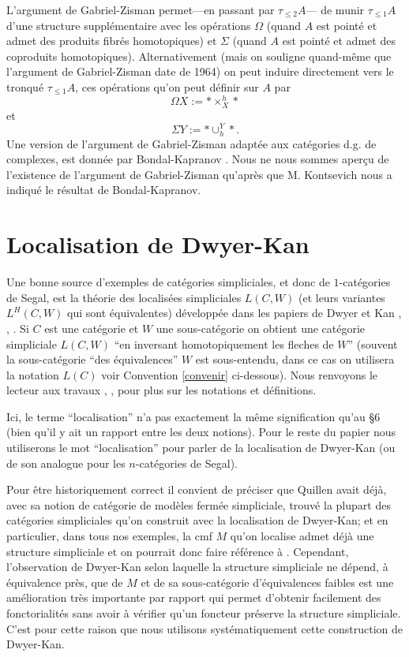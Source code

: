 \documentclass[12pt]{article}
\newcommand{\numero}[1]{\newpage\section{#1}}
\begin{document}
L'argument de Gabriel-Zisman permet---en passant par $\tau _{\leq 2}A$---
de munir $\tau _{\leq 1}A$
d'une structure suppl\'ementaire avec les
op\'erations $\Omega$ (quand $A$ est point\'e et admet des
produits fibr\'es homotopiques) et $\Sigma$ (quand $A$ est point\'e et admet des
coproduits homotopiques). Alternativement
(mais on souligne quand-m\^eme que l'argument de Gabriel-Zisman
date de 1964) on peut induire directement vers
le tronqu\'e $\tau _{\leq 1}A$, ces op\'erations qu'on peut d\'efinir
sur $A$ par
$$
\Omega X := \ast \times ^h_X \ast
$$
et
$$
\Sigma Y:= \ast \cup _h^Y \ast .
$$
Une version de l'argument de Gabriel-Zisman adapt\'ee aux cat\'egories
d.g. de complexes, est donn\'ee par Bondal-Kapranov
\cite{BondalKapranov}. Nous ne nous sommes aper\c{c}u de l'existence de
l'argument de Gabriel-Zisman qu'apr\`es que M. Kontsevich nous a
indiqu\'e
le r\'esultat de Bondal-Kapranov.




\numero{Localisation de Dwyer-Kan}
\label{dwyerkanpage}


Une bonne source d'exemples de cat\'egories simpliciales, et donc de
$1$-cat\'egories de Segal, est la th\'eorie des localis\'ees simpliciales
$L(C,W)$
(et leurs variantes $L^H(C,W)$ qui sont \'equivalentes) d\'evelopp\'ee dans
les
papiers de Dwyer et Kan \cite{DwyerKan1}, \cite{DwyerKan2}, \cite{DwyerKan3}.
Si $C$ est une cat\'egorie et $W$ une sous-cat\'egorie on obtient une
cat\'egorie simpliciale
$L(C,W)$ ``en inversant homotopiquement les fleches de $W$''
(souvent la sous-cat\'egorie ``des \'equivalences'' $W$ est sous-entendu,
dans ce cas on utilisera
la notation $L(C)$ voir Convention \ref{convenir} ci-dessous).  Nous
renvoyons le lecteur aux
travaux \cite{DwyerKan1}, \cite{DwyerKan2}, \cite{DwyerKan3} pour plus sur
les notations et
d\'efinitions.


Ici, le terme ``localisation'' n'a pas exactement
la m\^eme signification qu'au  \S 6 (bien qu'il y ait un rapport entre les
deux notions). Pour le reste du papier nous utiliserons le mot ``localisation''
pour parler de la localisation de Dwyer-Kan (ou de son analogue pour les
$n$-cat\'egories
de Segal).

Pour \^etre historiquement correct il convient de pr\'eciser que Quillen
\cite{Quillen} avait d\'ej\`a, avec
sa notion de cat\'egorie de mod\`eles ferm\'ee simpliciale,  trouv\'e
la plupart des cat\'egories simpliciales qu'on construit avec la localisation de
Dwyer-Kan; et en particulier, dans tous nos exemples, la cmf $M$
qu'on localise admet d\'ej\`a une
structure simpliciale et on pourrait donc faire r\'ef\'erence \`a
\cite{Quillen}.
Cependant, l'observation de Dwyer-Kan selon laquelle
la structure simpliciale ne d\'epend,
\`a \'equivalence pr\`es, que de $M$ et de sa sous-cat\'egorie d'\'equivalences
faibles est une am\'elioration tr\`es importante par rapport \cite{Quillen}
qui permet
d'obtenir facilement des fonctorialit\'es sans avoir \`a v\'erifier qu'un
foncteur pr\'eserve la structure simpliciale. C'est pour cette raison
que nous utilisons
syst\'ematiquement cette construction de Dwyer-Kan.
\end{document}
